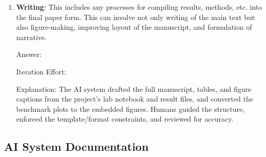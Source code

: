 \documentclass{article}
\begin{document}
\begin{enumerate}
    Explanation: The AI system computed the cosine/L2 metrics, aggregated the correctness/throughput/memory/downstream tables, and drafted the interpretations (e.g., the short-sequence quantization concentration and the CPU-vs-Metal throughput split). Humans verified the numbers against raw artifacts and sanity-checked the conclusions.

    \item \textbf{Writing}: This includes any processes for compiling results, methods, etc. into the final paper form. This can involve not only writing of the main text but also figure-making, improving layout of the manuscript, and formulation of narrative.

    Answer: \involvementC{}

    Iteration Effort: \iterationMedium{}

    Explanation: The AI system drafted the full manuscript, tables, and figure captions from the project's lab notebook and result files, and converted the benchmark plots to the embedded figures. Humans guided the structure, enforced the template/format constraints, and reviewed for accuracy.

\end{enumerate}

\subsection*{AI System Documentation}
\end{document}
